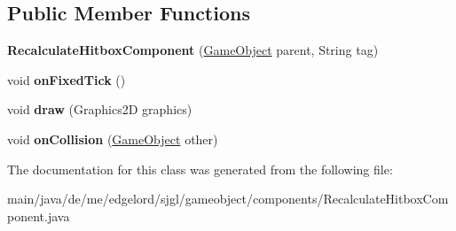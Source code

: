 \subsection*{Public Member Functions}
\begin{DoxyCompactItemize}
\item 
\mbox{\label{classde_1_1me_1_1edgelord_1_1sjgl_1_1gameobject_1_1components_1_1_recalculate_hitbox_component_affe880c5c0c85babfbd6ef318c8cdb12}} 
{\bfseries Recalculate\+Hitbox\+Component} (\mbox{\hyperlink{classde_1_1me_1_1edgelord_1_1sjgl_1_1gameobject_1_1_game_object}{Game\+Object}} parent, String tag)
\item 
\mbox{\label{classde_1_1me_1_1edgelord_1_1sjgl_1_1gameobject_1_1components_1_1_recalculate_hitbox_component_a2eb7f3b4e5a48500e32a5aa385ecdfbd}} 
void {\bfseries on\+Fixed\+Tick} ()
\item 
\mbox{\label{classde_1_1me_1_1edgelord_1_1sjgl_1_1gameobject_1_1components_1_1_recalculate_hitbox_component_ad4c431f221a6f70a4727090eed535cf4}} 
void {\bfseries draw} (Graphics2D graphics)
\item 
\mbox{\label{classde_1_1me_1_1edgelord_1_1sjgl_1_1gameobject_1_1components_1_1_recalculate_hitbox_component_a4f065408cc9c80e3c4e433f5bfc6ad12}} 
void {\bfseries on\+Collision} (\mbox{\hyperlink{classde_1_1me_1_1edgelord_1_1sjgl_1_1gameobject_1_1_game_object}{Game\+Object}} other)
\end{DoxyCompactItemize}


The documentation for this class was generated from the following file\+:\begin{DoxyCompactItemize}
\item 
main/java/de/me/edgelord/sjgl/gameobject/components/Recalculate\+Hitbox\+Component.\+java\end{DoxyCompactItemize}
